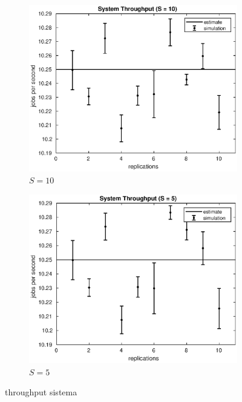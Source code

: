 \begin{figure}[!h]
%
\begin{subfigure}[t]{0.49\textwidth}
\includegraphics[width=\textwidth]{figures/simul/10_500K_x}
\caption{$S = 10$}
\label{10_x}
\end{subfigure}
%
\begin{subfigure}[t]{0.49\textwidth}
\includegraphics[width=\textwidth]{figures/simul/5_500K_x}
\caption{$S = 5$}
\label{5_x}
\end{subfigure}
%
\caption{throughput sistema}
\label{plot:x}
\end{figure}
%
%

